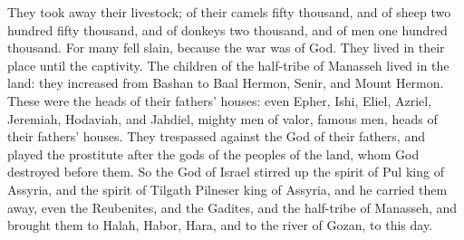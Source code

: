 {They took away their livestock; of their camels fifty thousand, and of sheep two hundred fifty thousand, and of donkeys two thousand, and of men one hundred thousand.
For many fell slain, because the war was of God. They lived in their place until the captivity.
The children of the half-tribe of Manasseh lived in the land: they increased from Bashan to Baal Hermon, Senir, and Mount Hermon.
These were the heads of their fathers’ houses: even Epher, Ishi, Eliel, Azriel, Jeremiah, Hodaviah, and Jahdiel, mighty men of valor, famous men, heads of their fathers’ houses.
They trespassed against the God of their fathers, and played the prostitute after the gods of the peoples of the land, whom God destroyed before them.
So the God of Israel stirred up the spirit of Pul king of Assyria, and the spirit of Tilgath Pilneser king of Assyria, and he carried them away, even the Reubenites, and the Gadites, and the half-tribe of Manasseh, and brought them to Halah, Habor, Hara, and to the river of Gozan, to this day.

}
